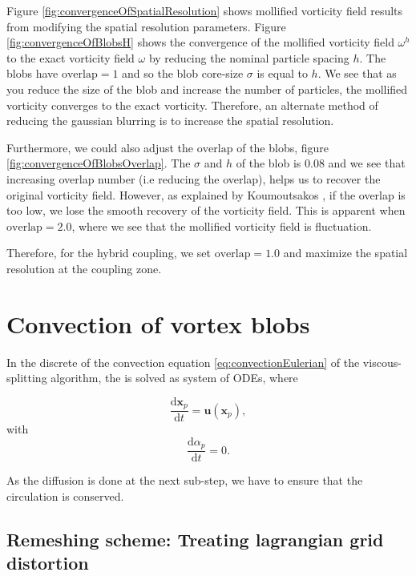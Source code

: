 Figure \ref{fig:convergenceOfSpatialResolution} shows mollified vorticity field results from modifying the spatial resolution parameters. Figure \ref{fig:convergenceOfBlobsH} shows the convergence of the mollified vorticity field $\omega^h$ to the exact vorticity field $\omega$ by reducing the nominal particle spacing $h$. The blobs have $\mathrm{overlap} = 1$ and so the blob core-size $\sigma$ is equal to $h$. We see that as you reduce the size of the blob and increase the number of particles, the mollified vorticity converges to the exact vorticity. Therefore, an alternate method of reducing the gaussian blurring is to increase the spatial resolution.

Furthermore, we could also adjust the $\mathrm{overlap}$ of the blobs, figure \ref{fig:convergenceOfBlobsOverlap}. The $\sigma$ and $h$ of the blob is $0.08$ and we see that increasing overlap number (i.e reducing the overlap), helps us to recover the original vorticity field. However, as explained by Koumoutsakos \cite{Cottet2000a}, if the overlap is too low, we lose the smooth recovery of the vorticity field. This is apparent when $\mathrm{overlap} = 2.0$, where we see that the mollified vorticity field is fluctuation.

Therefore, for the hybrid coupling, we set $\mathrm{overlap} = 1.0$ and maximize the spatial resolution at the coupling zone. 

\section{Convection of vortex blobs}

In the discrete of the convection equation \ref{eq:convectionEulerian} of the viscous-splitting algorithm, the is solved as system of ODEs, where

	\begin{equation}
	\frac{\mathrm{d}\mathbf{x}_p}{\mathrm{d}t} = \mathbf{u}\left(\mathbf{x}_p\right),
	\end{equation}
with
	\begin{equation}
	\frac{\mathrm{d}\alpha_p}{\mathrm{d}t} = 0.
	\end{equation}

As the diffusion is done at the next sub-step, we have to ensure that the circulation is conserved.


\subsection{Remeshing scheme: Treating lagrangian grid distortion}
\label{subsec:remeshing}
%

